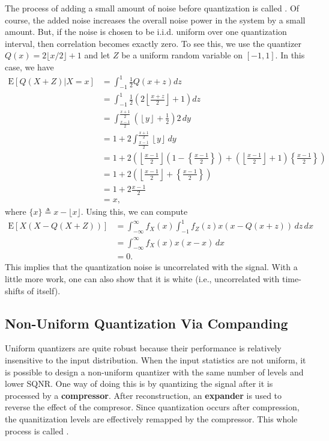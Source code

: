 The process of adding a small amount of noise before quantization is called .
Of course, the added noise increases the overall noise power in the system by a small amount.
But, if the noise is chosen to be i.i.d. uniform over one quantization interval, then correlation becomes exactly zero.
To see this, we use the quantizer $Q(x)=2\lfloor x/2 \rfloor + 1$ and let $Z$ be a uniform random variable on $[-1,1]$.
In this case, we have
\begin{align*}
\mathrm{E} \left[Q(X+Z)|X=x \right]
&= \int_{-1}^{1} \frac{1}{2} Q(x+z) dz \\
&= \int_{-1}^{1} \frac{1}{2} \left( 2\left\lfloor \frac{x+z}{2} \right\rfloor + 1 \right) dz \\
&= \int_{\frac{x-1}{2}}^{\frac{x+1}{2}} \left( \left\lfloor y \right\rfloor + \frac{1}{2} \right) 2 \, dy \\
&= 1 + 2 \int_{\frac{x-1}{2}}^{\frac{x+1}{2}} \left\lfloor y \right\rfloor \, dy \\
&= 1 + 2 \left( \left\lfloor \frac{x-1}{2} \right\rfloor \left( 1 - \left\{ \frac{x-1}{2} \right\} \right)
+ \left( \left\lfloor \frac{x-1}{2} \right\rfloor + 1 \right) \left\{\frac{x-1}{2}\right\} \right) \\
&= 1 + 2 \left( \left\lfloor \frac{x-1}{2} \right\rfloor + \left\{ \frac{x-1}{2} \right\} \right) \\
&= 1 + 2 \frac{x-1}{2} \\
&= x,
\end{align*}
where $\{ x \} \triangleq x-\lfloor x \rfloor$.
Using this, we can compute
\begin{align*}
\mathrm{E} \left[X \left(X - Q(X+Z)\right) \right] 
&= \int_{-\infty}^{\infty} f_{X} (x) \int_{-1}^{1} f_{Z} (z) x(x - Q(x+z)) \, dz \, dx \\
&= \int_{-\infty}^{\infty} f_{X} (x) x(x - x) \, dx \\
&= 0.
\end{align*}
This implies that the quantization noise is uncorrelated with the signal.
With a little more work, one can also show that it is white (i.e., uncorrelated with time-shifts of itself).


\subsection{Non-Uniform Quantization Via Companding}

Uniform quantizers are quite robust because their performance is relatively insensitive to the input distribution.
When the input statistics are not uniform, it is possible to design a non-uniform quantizer with the same number of levels and lower SQNR.
One way of doing this is by quantizing the signal after it is processed by a \textbf{compressor}.
After reconstruction, an \textbf{expander} is used to reverse the effect of the compresor.
Since quantization occurs after compression, the quanitization levels are effectively remapped by the compressor.
This whole process is called .


